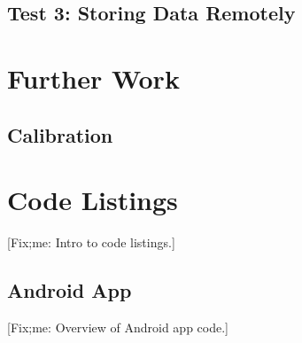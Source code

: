 \documentclass[11pt, a4paper, oneside, english]{scrbook}
\begin{document}
\section{Test 3: Storing Data Remotely} %
\label{sec:test_3_storing_data_remotely}

\chapter{Further Work} %
\label{cha:further_work}
\section{Calibration} %
\label{sec:calibration}

\chapter{Code Listings} %
\label{cha:code_listings}
[Fix;me: Intro to code listings.]
\section{Android App} %
\label{sec:android_app}
[Fix;me: Overview of Android app code.]

\newpage

\newpage

\newpage



\end{document}

